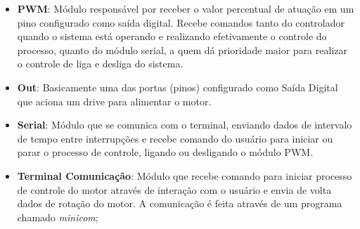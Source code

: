\begin{itemize}
\item \textbf{PWM}: Módulo responsável por receber o valor percentual de atuação em um pino configurado como saída digital. 
Recebe comandos tanto do controlador quando o sistema está operando e realizando efetivamente o controle do processo, quanto do módulo serial, a quem dá prioridade maior para realizar o controle de liga e desliga do sistema. 

\item \textbf{Out}: Basicamente uma das portas (pinos) configurado como Saída Digital que aciona um drive para alimentar o motor.


\item \textbf{Serial}: Módulo que se comunica com o terminal, enviando dados de intervalo de tempo entre interrupções e recebe comando do usuário para iniciar ou parar o processo de controle, ligando ou desligando o módulo PWM.

\item \textbf{Terminal Comunicação}: Módulo que recebe comando para iniciar processo de controle do motor através de interação com o usuário e envia de volta dados de rotação do motor. 
A comunicação é feita através de um programa chamado \emph{minicom};

\end{itemize}


